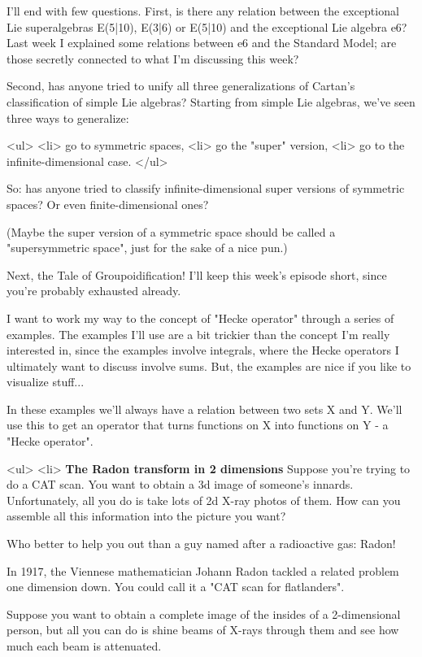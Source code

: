 I'll end with few questions.  First, is there any relation 
between the exceptional Lie superalgebras E(5|10), E(3|6) or 
E(5|10) and the exceptional Lie algebra e6?  Last week I 
explained some relations between e6 and the Standard Model; 
are those secretly connected to what I'm discussing this week?

Second, has anyone tried to unify all three generalizations of
Cartan's classification of simple Lie algebras?  Starting from 
simple Lie algebras, we've seen three ways to generalize:

<ul>
<li>
go to symmetric spaces,
<li>
go the "super" version,
<li>
go to the infinite-dimensional case.
</ul>

So: has anyone tried to classify infinite-dimensional super 
versions of symmetric spaces?  Or even finite-dimensional ones?  

(Maybe the super version of a symmetric space should be 
called a "supersymmetric space", just for the sake of a nice pun.)

Next, the Tale of Groupoidification!  I'll keep this week's
episode short, since you're probably exhausted already.

I want to work my way to the concept of "Hecke operator" 
through a series of examples.  The examples I'll use are a bit
trickier than the concept I'm really interested in, since the 
examples involve integrals, where the Hecke operators I ultimately
want to discuss involve sums.  But, the examples are nice if
you like to visualize stuff...

In these examples we'll always have a relation between two sets 
X and Y.  We'll use this to get an operator that turns functions 
on X into functions on Y - a "Hecke operator".  

<ul>
<li>
\textbf{The Radon transform in 2 dimensions}
Suppose you're trying to do a CAT scan.  You want to obtain 
a 3d image of someone's innards.  Unfortunately, all you do is 
take lots of 2d X-ray photos of them.  How can you assemble all 
this information into the picture you want?

Who better to help you out than a guy named after a 
radioactive gas: Radon!  

In 1917, the Viennese mathematician Johann Radon tackled a related 
problem one dimension down.  You could call it a "CAT scan for 
flatlanders".  

Suppose you want to obtain a complete image of the insides of a 
2-dimensional person, but all you can do is shine beams of X-rays 
through them and see how much each beam is attenuated.  


